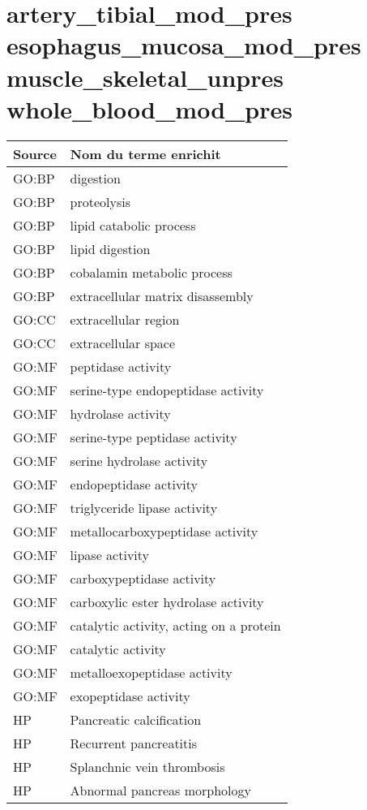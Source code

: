 \section*{artery\_tibial\_mod\_pres \newline esophagus\_mucosa\_mod\_pres \newline muscle\_skeletal\_unpres \newline whole\_blood\_mod\_pres}

\begin{longtable}{ll}
\toprule
Source & Nom du terme enrichit\\
\midrule
GO:BP & digestion\\
GO:BP & proteolysis\\
GO:BP & lipid catabolic process\\
GO:BP & lipid digestion\\
GO:BP & cobalamin metabolic process\\
GO:BP & extracellular matrix disassembly\\
GO:CC & extracellular region\\
GO:CC & extracellular space\\
GO:MF & peptidase activity\\
GO:MF & serine-type endopeptidase activity\\
GO:MF & hydrolase activity\\
GO:MF & serine-type peptidase activity\\
GO:MF & serine hydrolase activity\\
GO:MF & endopeptidase activity\\
GO:MF & triglyceride lipase activity\\
GO:MF & metallocarboxypeptidase activity\\
GO:MF & lipase activity\\
GO:MF & carboxypeptidase activity\\
GO:MF & carboxylic ester hydrolase activity\\
GO:MF & catalytic activity, acting on a protein\\
GO:MF & catalytic activity\\
GO:MF & metalloexopeptidase activity\\
GO:MF & exopeptidase activity\\
HP & Pancreatic calcification\\
HP & Recurrent pancreatitis\\
HP & Splanchnic vein thrombosis\\
HP & Abnormal pancreas morphology\\

\end{longtable}
